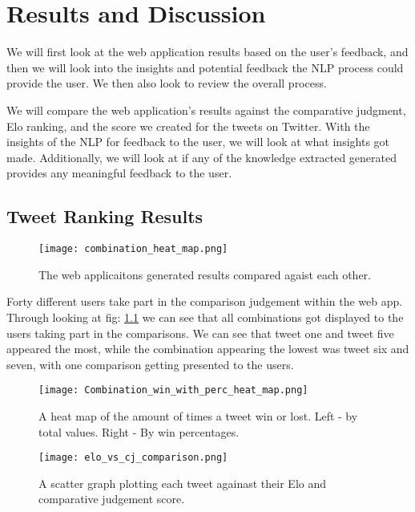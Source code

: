 \chapter{Results and Discussion}
\label{chap:results}

We will first look at the web application results based on the user's feedback, and then we will look into the insights and potential feedback the NLP process could provide the user. We then also look to review the overall process. 

We will compare the web application's results against the comparative judgment, Elo ranking, and the score we created for the tweets on Twitter. With the insights of the NLP for feedback to the user, we will look at what insights got made. Additionally, we will look at if any of the knowledge extracted generated provides any meaningful feedback to the user.



\section{Tweet Ranking Results} 
\label{sec:reaults_ranking}

	\begin{figure}[h]
		\centering
		\texttt{[image: combination\_heat\_map.png]}
		\caption{The web applicaitons generated results compared agaist each other.}
		\label{fig:combinations}
		
	\end{figure}
	
	Forty different users take part in the comparison judgement within the web app. Through looking at fig: \ref{fig:combinations} we can see that all combinations got displayed to the users taking part in the comparisons. We can see that tweet one and tweet five appeared the most, while the combination appearing the lowest was tweet six and seven, with one comparison getting presented to the users.
	
	\begin{figure}[t]
		\centering
		\texttt{[image: Combination\_win\_with\_perc\_heat\_map.png]}
		\caption{A heat map of the amount of times a tweet win or lost. Left - by total values. Right - By win percentages.}
		\label{fig:Combination_win_with_perc_heat_map}
		
	\end{figure}
	
	\begin{figure}[b]
		\centering
		\texttt{[image: elo\_vs\_cj\_comparison.png]}
		\caption{A scatter graph plotting each tweet againast their Elo and comparative judgement score.}
		\label{fig:elo_vs_cj_comparison}
		
	\end{figure}
	
